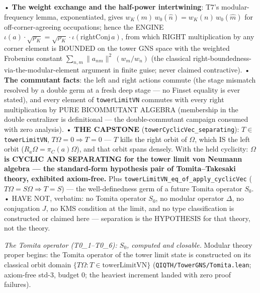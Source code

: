 \documentclass[11pt,a4paper]{article}
\begin{document}
  • \textbf{The weight exchange and the half-power intertwining}: T7's modular-frequency lemma, exponentiated, gives $w_K(m)\,w_0(\hat n) = w_K(n)\,w_0(\hat m)$ for off-corner-agreeing occupations; hence the ENGINE $\iota(a)\cdot\sqrt{\rho_K} = \sqrt{\rho_K}\cdot\iota(\mathrm{rightConj}\,a)$, from which RIGHT multiplication by any corner element is BOUNDED on the tower GNS space with the weighted Frobenius constant $\sum_{n,m}\|a_{nm}\|^2\,(w_m/w_n)$ (the classical right-boundedness-via-the-modular-element argument in finite guise; never claimed contractive).
  • \textbf{The commutant facts}: the left and right actions commute (the stage mismatch resolved by a double germ at a fresh deep stage — no Finset equality is ever stated), and every element of \texttt{towerLimitVN} commutes with every right multiplication by PURE BICOMMUTANT ALGEBRA (membership in the double centralizer is definitional — the double-commutant campaign consumed with zero analysis).
  • \textbf{THE CAPSTONE} (\texttt{towerCyclicVec\_separating}): $T \in$ \texttt{towerLimitVN}, $T\Omega = 0 \Rightarrow T = 0$ — $T$ kills the right orbit of $\Omega$, which IS the left orbit ($R_a\Omega = \pi_C(a)\Omega$), and that orbit spans densely. With the held cyclicity: \textbf{$\Omega$ is CYCLIC AND SEPARATING for the tower limit von Neumann algebra — the standard-form hypothesis pair of Tomita--Takesaki theory, exhibited axiom-free.} Plus \texttt{towerLimitVN\_eq\_of\_apply\_cyclicVec} ($T\Omega = S\Omega \Rightarrow T = S$) — the well-definedness germ of a future Tomita operator $S_0$.
  • HAVE NOT, verbatim: no Tomita operator $S_0$, no modular operator $\Delta$, no conjugation $J$, no KMS condition at the limit, and no type classification is constructed or claimed here — separation is the HYPOTHESIS for that theory, not the theory.

\emph{The Tomita operator (T0\_1--T0\_6): $S_0$, computed and closable.} Modular theory proper begins: the Tomita operator of the tower limit state is constructed on its classical orbit domain $\{T\Omega : T \in \mathrm{towerLimitVN}\}$ (\texttt{QIQTH/TowerGNS/Tomita.lean}; axiom-free std-3, budget 0; the heaviest increment landed with zero proof failures).
\end{document}
